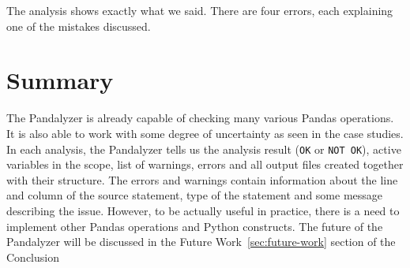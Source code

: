 The analysis shows exactly what we said.
There are four errors, each explaining one of the mistakes discussed.

\section*{Summary}

The Pandalyzer is already capable of checking many various Pandas operations.
It is also able to work with some degree of uncertainty as seen in the case studies.
In each analysis, the Pandalyzer tells us the analysis result (\verb|OK| or \verb|NOT OK|), active variables in the
scope, list of warnings, errors and all output files created together with their structure.
The errors and warnings contain information about the line and column of the source statement, type of the statement
and some message describing the issue.
However, to be actually useful in practice, there is a need to implement other Pandas operations and Python constructs.
The future of the Pandalyzer will be discussed in the Future Work~\ref{sec:future-work} section of the Conclusion
